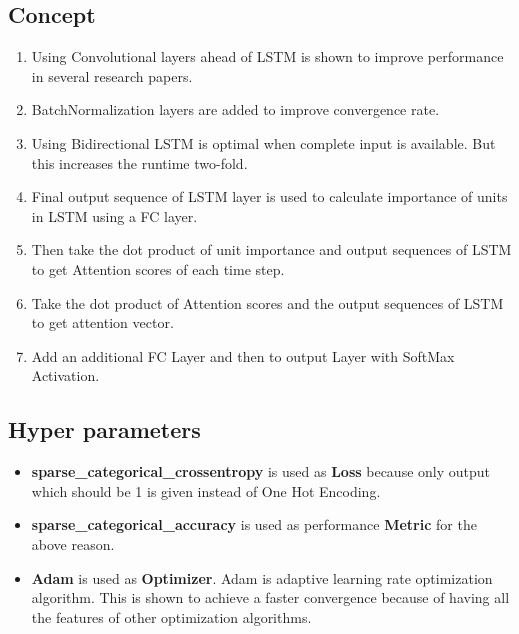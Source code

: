 \documentclass[11pt,english]{article}
\begin{document}
\subsection{Concept}
\begin{enumerate}
    \item Using Convolutional layers ahead of LSTM is shown to improve performance in several research papers.
    \item BatchNormalization layers are added to improve convergence rate.
    \item Using Bidirectional LSTM is optimal when complete input is available. But this increases the runtime two-fold.
    \item Final output sequence of LSTM layer is used to calculate importance of units in LSTM using a FC layer.
    \item Then take the dot product of unit importance and output sequences of LSTM to get Attention scores of each time step.
    \item Take the dot product of Attention scores and the output sequences of LSTM to get attention vector.
    \item Add an additional FC Layer and then to output Layer with SoftMax Activation.
\end{enumerate}

\subsection{Hyper parameters}
\begin{itemize}
    \item \textbf{sparse\_categorical\_crossentropy} is used as \textbf{Loss} because only output which should be 1 is given instead of One Hot Encoding.
    \item \textbf{sparse\_categorical\_accuracy} is used as performance \textbf{Metric} for the above reason.
    \item \textbf{Adam} is used as \textbf{Optimizer}. Adam is adaptive learning rate optimization algorithm. This is shown to achieve a faster convergence because of having all the features of other optimization algorithms.
\end{itemize}
\end{document}
